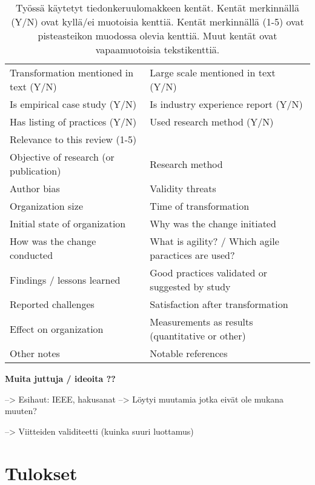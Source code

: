 \begin{table}
    \begin{tabular}{|l|l|}
        \hline
        Transformation mentioned in text (Y/N) &
        Large scale mentioned in text (Y/N) \\
        Is empirical case study (Y/N) &
        Is industry experience report (Y/N) \\
        Has listing of practices (Y/N) &
        Used research method (Y/N) \\
        Relevance to this review (1-5) & \\
        Objective of research (or publication) &
        Research method \\
        Author bias &
        Validity threats \\
        Organization size &
        Time of transformation \\
        Initial state of organization &
        Why was the change initiated \\
        How was the change conducted &
        What is agility? / Which agile paractices are used? \\
        Findings / lessons learned &
        Good practices validated or suggested by study \\
        Reported challenges &
        Satisfaction after transformation \\
        Effect on organization &
        Measurements as results (quantitative or other) \\
        Other notes &
        Notable references \\
        \hline
    \end{tabular}
    \caption{Työssä käytetyt tiedonkeruulomakkeen kentät. Kentät merkinnällä
    (Y/N) ovat kyllä/ei muotoisia kenttiä. Kentät merkinnällä (1-5) ovat
    pisteasteikon muodossa olevia kenttiä. Muut kentät ovat vapaamuotoisia
    tekstikenttiä.}
    \label{table:dataform}
\end{table}


\vspace{1cm}
\textbf{Muita juttuja / ideoita ??}

--> Esihaut: IEEE, hakusanat --> Löytyi muutamia jotka eivät ole mukana muuten?

--> Viitteiden validiteetti (kuinka suuri luottamus)


\section{Tulokset}
\label{sec:tulokset}


